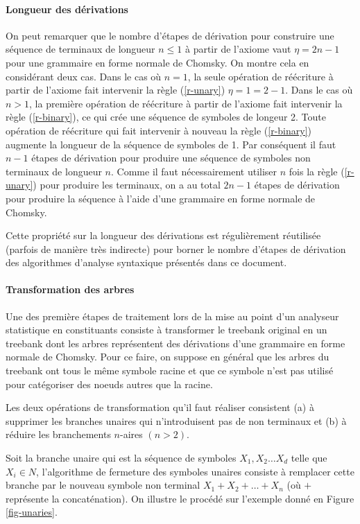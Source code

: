 \documentclass[11pt,openany]{book}
\begin{document}
\paragraph{Longueur des dérivations} On peut remarquer que le nombre d'étapes de dérivation pour construire une séquence de terminaux de longueur $n \leq 1$ à partir de l'axiome 
vaut  $\eta = 2n-1$ pour une grammaire en forme normale de Chomsky.
On montre cela en considérant deux cas.
Dans le cas où $n=1$, la seule opération de réécriture à partir de l'axiome fait intervenir la règle ({\ref{r-unary}}) $\eta = 1 = 2-1$.
Dans le cas où $n > 1$, la première opération de réécriture  à partir de l'axiome fait intervenir la règle ({\ref{r-binary}}),
ce qui crée une séquence de symboles de longeur 2. Toute opération de réécriture qui fait intervenir à nouveau la règle 
({\ref{r-binary}}) augmente la longueur de la séquence de symboles de 1. Par conséquent il faut $n-1$ étapes de dérivation pour produire une 
séquence de symboles non terminaux de longueur $n$. Comme il faut nécessairement utiliser $n$ fois la règle ({\ref{r-unary}}) pour produire les terminaux,
on a au total $2n-1$ étapes de dérivation pour produire la séquence à l'aide d'une grammaire en forme normale de Chomsky.

Cette propriété sur la longueur des dérivations est régulièrement réutilisée (parfois de manière très indirecte) pour borner le nombre d'étapes 
de dérivation des algorithmes d'analyse syntaxique présentés dans ce document.

\paragraph{Transformation des arbres}
Une des première étapes de traitement lors de la mise au point d'un analyseur statistique en constituants consiste à transformer le treebank original
en un treebank dont les arbres représentent des dérivations d'une grammaire en forme normale de Chomsky. 
Pour ce faire, on suppose en général que les arbres du treebank ont tous le même symbole racine et que ce symbole n'est pas utilisé pour catégoriser des noeuds autres
que la racine. 

Les deux opérations de transformation qu'il faut réaliser consistent (a) à supprimer les branches unaires qui n'introduisent pas
de non terminaux et (b) à réduire les branchements $n$-aires $(n > 2)$.

Soit la branche unaire qui est la séquence de symboles  $X_1, X_2 \ldots X_d$ telle que $X_i\in N$, 
l'algorithme de fermeture des symboles unaires consiste à remplacer cette branche par le nouveau symbole non terminal
$X_1+X_2+\ldots + X_n$ (où $+$ représente la concaténation). On illustre le procédé sur l'exemple donné en Figure \ref{fig-unaries}.
\end{document}
